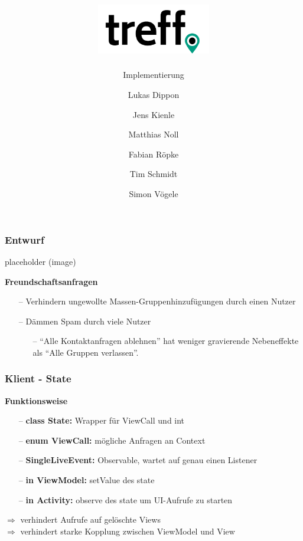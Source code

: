 \documentclass[aspectratio=1610]{beamer}
\title{\includegraphics[width = 50mm]{images/logo_crop.png}}
\subtitle{\huge Implementierung}
\author{Lukas Dippon
	\and Jens Kienle
	\and Matthias Noll
	\and Fabian Röpke
	\and Tim Schmidt
	\and Simon Vögele}
\begin{document}
	\begin{frame}[plain]
	\maketitle
	\end{frame}


	\begin{frame}[plain]
		\frametitle{Entwurf}

		\begin{minipage}{0.5\textwidth}
		placeholder (image)
		\end{minipage}%
		\begin{minipage}{0.5\textwidth}
		\textbf{Freundschaftsanfragen}
		\begin{itemize}
			\setlength\itemsep{0.3em}
            \item[--] Verhindern ungewollte Massen-Gruppenhinzufügungen durch
                einen Nutzer
            \item[--] Dämmen Spam durch viele Nutzer
                \begin{itemize}
                    \item[--] \enquote{Alle Kontaktanfragen ablehnen} hat
                        weniger gravierende Nebeneffekte als \enquote{Alle
                        Gruppen verlassen}.
                \end{itemize}
		\end{itemize}
		\end{minipage}

	\end{frame}


	\begin{frame}[plain]
		\frametitle{Klient - State}
		\textbf{Funktionsweise}
		\begin{itemize}
			\setlength\itemsep{0.3em}
			\item[--] \textbf{class State:} Wrapper für ViewCall und int
			\item[--] \textbf{enum ViewCall:} mögliche Anfragen an Context
			\item[--] \textbf{SingleLiveEvent:} Observable, wartet auf
			genau einen Listener
			\item[--] \textbf{in ViewModel:} setValue des state
			\item[--] \textbf{in Activity:} observe des state um UI-Aufrufe
			zu starten
		\end{itemize}
	$\Rightarrow$ verhindert Aufrufe auf gelöschte Views \\
	$\Rightarrow$ verhindert starke Kopplung zwischen ViewModel und View
	\end{frame}
\end{document}
